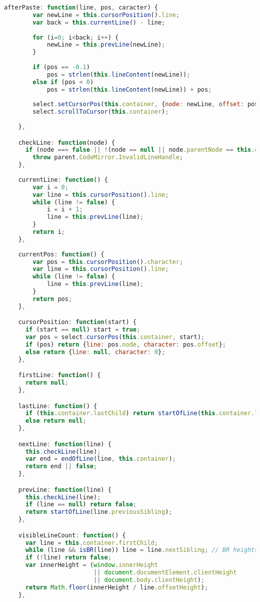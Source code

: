 \begin{lstlisting}[language=Javascript]
    afterPaste: function(line, pos, caracter) {
    	var newLine = this.cursorPosition().line;
    	var back = this.currentLine() - line;
    	
    	for (i=0; i<back; i++) {
    		newLine = this.prevLine(newLine);
    	}
    	
    	if (pos == -0.1)
    		pos = strlen(this.lineContent(newLine));
    	else if (pos < 0)
    		pos = strlen(this.lineContent(newLine)) + pos;
    		
    	select.setCursorPos(this.container, {node: newLine, offset: pos});
        select.scrollToCursor(this.container);
 
    },

    checkLine: function(node) {
      if (node === false || !(node == null || node.parentNode == this.container))
        throw parent.CodeMirror.InvalidLineHandle;
    },
    
    currentLine: function() {
    	var i = 0;
    	var line = this.cursorPosition().line;
	    while (line != false) {
			i = i + 1;
			line = this.prevLine(line);
		}
		return i;
    },
    
    currentPos: function() {
    	var pos = this.cursorPosition().character;
    	var line = this.cursorPosition().line;
    	while (line != false) {
    		line = this.prevLine(line);
    	}
    	return pos;
    },

    cursorPosition: function(start) {
      if (start == null) start = true;
      var pos = select.cursorPos(this.container, start);
      if (pos) return {line: pos.node, character: pos.offset};
      else return {line: null, character: 0};
    },

    firstLine: function() {
      return null;
    },

    lastLine: function() {
      if (this.container.lastChild) return startOfLine(this.container.lastChild);
      else return null;
    },

    nextLine: function(line) {
      this.checkLine(line);
      var end = endOfLine(line, this.container);
      return end || false;
    },

    prevLine: function(line) {
      this.checkLine(line);
      if (line == null) return false;
      return startOfLine(line.previousSibling);
    },

    visibleLineCount: function() {
      var line = this.container.firstChild;
      while (line && isBR(line)) line = line.nextSibling; // BR heights are unreliable
      if (!line) return false;
      var innerHeight = (window.innerHeight
                         || document.documentElement.clientHeight
                         || document.body.clientHeight);
      return Math.floor(innerHeight / line.offsetHeight);
    },


\end{lstlisting}
